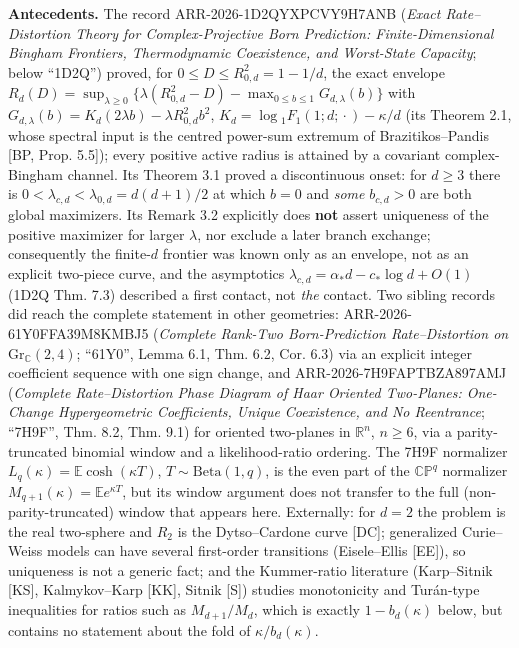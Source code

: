 \documentclass[
  11pt,
  a4paper,
]{article}
\begin{document}
\textbf{Antecedents.} The record ARR-2026-1D2QYXPCVY9H7ANB (\emph{Exact
Rate--Distortion Theory for Complex-Projective Born Prediction:
Finite-Dimensional Bingham Frontiers, Thermodynamic Coexistence, and
Worst-State Capacity}; below ``1D2Q'') proved, for
\(0\le D\le R_{0,\allowbreak{}d}^2=1-1/d\), the exact envelope
\(R_d(D)=\sup_{\lambda\ge0}\{\lambda(R_{0,\allowbreak{}d}^2-D)-\max_{0\le b\le1}G_{d,\allowbreak{}\lambda}(b)\}\)
with \(G_{d,\allowbreak{}\lambda}(b)=K_d(2\lambda b)-\lambda R_{0,\allowbreak{}d}^2b^2\),
\(K_d=\log{}_1F_1(1;\allowbreak{}d;\allowbreak{}\cdot)-\kappa/d\) (its Theorem 2.1, whose spectral
input is the centred power-sum extremum of Brazitikos--Pandis {[}BP,
Prop. 5.5{]}); every positive active radius is attained by a covariant
complex-Bingham channel. Its Theorem 3.1 proved a discontinuous onset:
for \(d\ge3\) there is \(0<\lambda_{c,\allowbreak{}d}<\lambda_{0,\allowbreak{}d}=d(d+1)/2\) at
which \(b=0\) and \emph{some} \(b_{c,\allowbreak{}d}>0\) are both global maximizers.
Its Remark 3.2 explicitly does \textbf{not} assert uniqueness of the
positive maximizer for larger \(\lambda\), nor exclude a later branch
exchange; consequently the finite-\(d\) frontier was known only as an
envelope, not as an explicit two-piece curve, and the asymptotics
\(\lambda_{c,\allowbreak{}d}=\alpha_*d-c_*\log d+O(1)\) (1D2Q Thm. 7.3) described a
first contact, not \emph{the} contact. Two sibling records did reach the
complete statement in other geometries: ARR-2026-61Y0FFA39M8KMBJ5
(\emph{Complete Rank-Two Born-Prediction Rate--Distortion on
\(\mathrm{Gr}_{\mathbb C}(2,\allowbreak{}4)\)}; ``61Y0'', Lemma 6.1, Thm. 6.2, Cor.
6.3) via an explicit integer coefficient sequence with one sign change,
and ARR-2026-7H9FAPTBZA897AMJ (\emph{Complete Rate--Distortion Phase
Diagram of Haar Oriented Two-Planes: One-Change Hypergeometric
Coefficients, Unique Coexistence, and No Reentrance}; ``7H9F'', Thm.
8.2, Thm. 9.1) for oriented two-planes in \(\mathbb R^n\), \(n\ge6\),
via a parity-truncated binomial window and a likelihood-ratio ordering.
The 7H9F normalizer \(L_q(\kappa)=\mathbb E\cosh(\kappa T)\),
\(T\sim\mathrm{Beta}(1,\allowbreak{}q)\), is the even part of the \(\mathbb{CP}^{q}\)
normalizer \(M_{q+1}(\kappa)=\mathbb E e^{\kappa T}\), but its window
argument does not transfer to the full (non-parity-truncated) window
that appears here. Externally: for \(d=2\) the problem is the real
two-sphere and \(R_2\) is the Dytso--Cardone curve {[}DC{]}; generalized
Curie--Weiss models can have several first-order transitions
(Eisele--Ellis {[}EE{]}), so uniqueness is not a generic fact; and the
Kummer-ratio literature (Karp--Sitnik {[}KS{]}, Kalmykov--Karp {[}KK{]},
Sitnik {[}S{]}) studies monotonicity and Turán-type inequalities for
ratios such as \(M_{d+1}/M_d\), which is exactly \(1-b_d(\kappa)\)
below, but contains no statement about the fold of
\(\kappa/b_d(\kappa)\).
\end{document}
